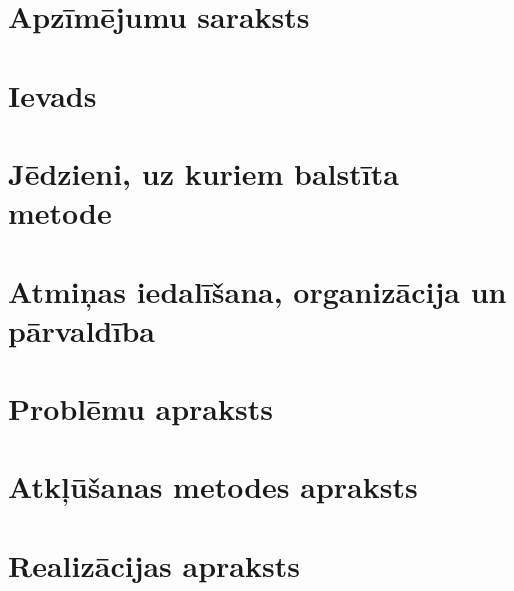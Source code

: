 \documentclass[12pt]{report}
\begin{document}

\setcounter{secnumdepth}{-1}

\clearpage


\tableofcontents
{}
\setcounter{page}{0}
\setcounter{secnumdepth}{-1}
\chapter{Apzīmējumu saraksts}



\setcounter{secnumdepth}{-1}
\chapter{Ievads}


\setcounter{secnumdepth}{2}
\setcounter{chapter}{0}
\chapter{Jēdzieni, uz kuriem balstīta metode}


\chapter{Atmiņas iedalīšana, organizācija un pārvaldība}\label{chap:chapter_2} %


\chapter{Problēmu apraksts}\label{chap:chapter_3} %


\chapter{Atkļūšanas metodes apraksts}\label{chap:chapter_4} %


\chapter{Realizācijas apraksts}\label{chap:chapter_5}


%
%
%
%
%
%
%
%
\setcounter{secnumdepth}{-1}
\end{document}

